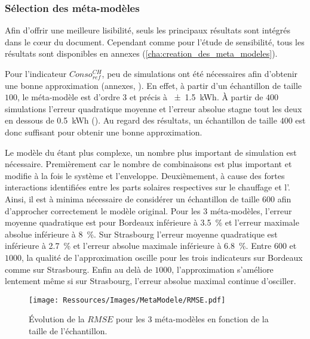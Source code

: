 \subsubsection{Sélection des méta-modèles} %
\label{ssub:selection_des_meta_modeles}
Afin d’offrir une meilleure lisibilité, seuls les principaux résultats sont intégrés dans
le cœur du document. Cependant comme pour l’étude de sensibilité, tous
les résultats sont disponibles en annexes (\ref{cha:creation_des_meta_modeles}).

Pour l’indicateur $Conso_{ref}^{CH}$, peu de simulations ont été nécessaires afin
d’obtenir une bonne approximation (annexes, ). En effet,
à partir d’un échantillon de taille $100$, le méta-modèle est d’ordre $3$ et précis à
\SI{+- 1.5}{kWh}. À partir de $400$ simulations l’erreur quadratique moyenne et l’erreur
absolue stagne tout les deux en dessous de \SI{0.5}{kWh} ().
Au regard des résultats, un échantillon de taille $400$ est donc suffisant pour obtenir
une bonne approximation.

Le modèle du  étant plus complexe, un nombre plus important de simulation est
nécessaire. Premièrement car le nombre de combinaisons est plus important et modifie à la
fois le système et l’enveloppe. Deuxièmement, à cause des fortes interactions identifiées
entre les parts solaires respectives sur le chauffage et l’. Ainsi, il est à
minima nécessaire de considérer un échantillon de taille $600$ afin d’approcher
correctement le modèle original. Pour les $3$ méta-modèles, l’erreur moyenne quadratique
est pour Bordeaux inférieure à \SI{3.5}{\percent} et l’erreur maximale absolue inférieure
à \SI{8}{\percent}. Sur Strasbourg l’erreur moyenne quadratique est inférieure à
\SI{2.7}{\percent} et l’erreur absolue maximale inférieure à \SI{6.8}{\percent}. Entre
$600$ et $1000$, la qualité de l’approximation oscille pour les trois indicateurs sur
Bordeaux comme sur Strasbourg. Enfin au delà de $1000$, l’approximation s’améliore
lentement même si sur Strasbourg, l’erreur absolue maximal continue d’osciller.


\begin{figure}
    \centering
    \texttt{[image: Ressources/Images/MetaModele/RMSE.pdf]}
    \caption[Évolution de la $RMSE$ en fonction de l’échantillon]
            {Évolution de la $RMSE$ pour les \num{3} méta-modèles
             en fonction de la taille de l’échantillon.}
    \label{fig:rmse}
\end{figure}

